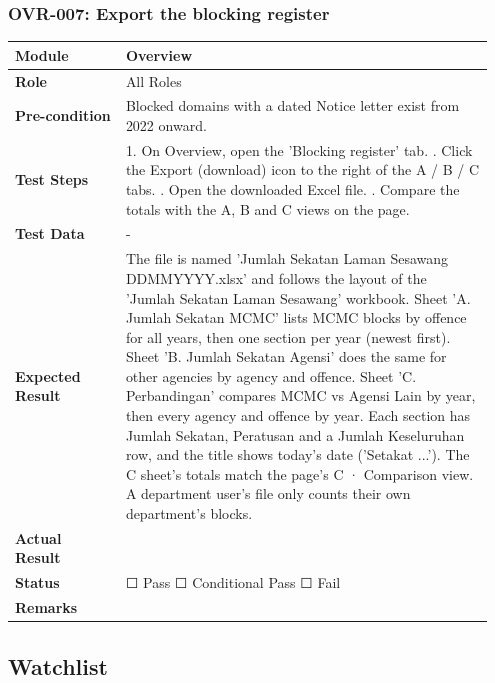 \documentclass[10pt]{article}
\begin{document}
\subsubsection*{OVR-007: Export the blocking register}
\begin{longtable}{p{0.22\linewidth}p{0.73\linewidth}}
\hline
\textbf{Module} & Overview \\ \hline
\textbf{Role} & All Roles \\ \hline
\textbf{Pre-condition} & Blocked domains with a dated Notice letter exist from 2022 onward. \\ \hline
\textbf{Test Steps} & 1. On Overview, open the 'Blocking register' tab. \newline 2. Click the Export (download) icon to the right of the A / B / C tabs. \newline 3. Open the downloaded Excel file. \newline 4. Compare the totals with the A, B and C views on the page. \\ \hline
\textbf{Test Data} & - \\ \hline
\textbf{Expected Result} & The file is named 'Jumlah Sekatan Laman Sesawang DDMMYYYY.xlsx' and follows the layout of the 'Jumlah Sekatan Laman Sesawang' workbook. Sheet 'A. Jumlah Sekatan MCMC' lists MCMC blocks by offence for all years, then one section per year (newest first). Sheet 'B. Jumlah Sekatan Agensi' does the same for other agencies by agency and offence. Sheet 'C. Perbandingan' compares MCMC vs Agensi Lain by year, then every agency and offence by year. Each section has Jumlah Sekatan, Peratusan and a Jumlah Keseluruhan row, and the title shows today's date ('Setakat ...'). The C sheet's totals match the page's C · Comparison view. A department user's file only counts their own department's blocks. \\ \hline
\textbf{Actual Result} & \newline \newline \\ \hline
\textbf{Status} & ☐ Pass \quad ☐ Conditional Pass \quad ☐ Fail \\ \hline
\textbf{Remarks} & \newline \\ \hline
\end{longtable}
\subsection{Watchlist}
\end{document}
